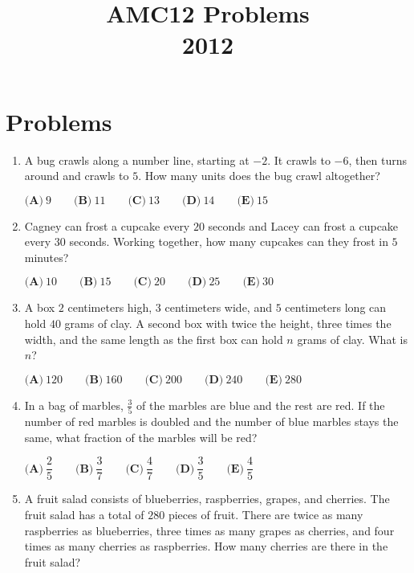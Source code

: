 \documentclass{article}
\title{AMC12 Problems \\ 2012}
\date{}
\begin{document}
\maketitle\thispagestyle{fancy}\newpage\section*{Problems}\begin{enumerate}[label=\arabic*., itemsep=0.5em]\item A bug crawls along a number line, starting at $-2$. It crawls to $-6$, then turns around and crawls to $5$. How many units does the bug crawl altogether?

$ \textbf{(A)}\ 9\qquad\textbf{(B)}\ 11\qquad\textbf{(C)}\ 13\qquad\textbf{(D)}\ 14\qquad\textbf{(E)}\ 15 $\par \vspace{0.5em}\item Cagney can frost a cupcake every $20$ seconds and Lacey can frost a cupcake every $30$ seconds. Working together, how many cupcakes can they frost in $5$ minutes?

$ \textbf{(A)}\ 10\qquad\textbf{(B)}\ 15\qquad\textbf{(C)}\ 20\qquad\textbf{(D)}\ 25\qquad\textbf{(E)}\ 30 $\par \vspace{0.5em}\item A box $2$ centimeters high, $3$ centimeters wide, and $5$ centimeters long can hold $40$ grams of clay.  A second box with twice the height, three times the width, and the same length as the first box can hold $n$ grams of clay.  What is $n$?

$\textbf{(A)}\ 120\qquad\textbf{(B)}\ 160\qquad\textbf{(C)}\ 200\qquad\textbf{(D)}\ 240\qquad\textbf{(E)}\ 280$\par \vspace{0.5em}\item In a bag of marbles, $\tfrac{3}{5}$ of the marbles are blue and the rest are red.  If the number of red marbles is doubled and the number of blue marbles stays the same, what fraction of the marbles will be red?

$ \textbf{(A)}\ \dfrac{2}{5}
\qquad\textbf{(B)}\ \dfrac{3}{7}
\qquad\textbf{(C)}\ \dfrac{4}{7}
\qquad\textbf{(D)}\ \dfrac{3}{5}
\qquad\textbf{(E)}\ \dfrac{4}{5}
 $\par \vspace{0.5em}\item A fruit salad consists of blueberries, raspberries, grapes, and cherries.  The fruit salad has a total of $280$ pieces of fruit.  There are twice as many raspberries as blueberries, three times as many grapes as cherries, and four times as many cherries as raspberries.  How many cherries are there in the fruit salad?


\end{enumerate}
\end{document}

